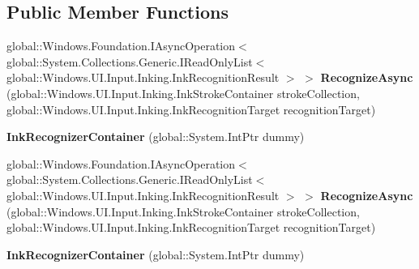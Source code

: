 \subsection*{Public Member Functions}
\begin{DoxyCompactItemize}
\item 
\mbox{\label{class_windows_1_1_u_i_1_1_input_1_1_inking_1_1_ink_recognizer_container_abab854db5f283434d57a1f4170f14769}} 
global\+::\+Windows.\+Foundation.\+I\+Async\+Operation$<$ global\+::\+System.\+Collections.\+Generic.\+I\+Read\+Only\+List$<$ global\+::\+Windows.\+U\+I.\+Input.\+Inking.\+Ink\+Recognition\+Result $>$ $>$ {\bfseries Recognize\+Async} (global\+::\+Windows.\+U\+I.\+Input.\+Inking.\+Ink\+Stroke\+Container stroke\+Collection, global\+::\+Windows.\+U\+I.\+Input.\+Inking.\+Ink\+Recognition\+Target recognition\+Target)
\item 
\mbox{\label{class_windows_1_1_u_i_1_1_input_1_1_inking_1_1_ink_recognizer_container_a9ccc23f7cda60be5d7638b6d3d12400f}} 
{\bfseries Ink\+Recognizer\+Container} (global\+::\+System.\+Int\+Ptr dummy)
\item 
\mbox{\label{class_windows_1_1_u_i_1_1_input_1_1_inking_1_1_ink_recognizer_container_abab854db5f283434d57a1f4170f14769}} 
global\+::\+Windows.\+Foundation.\+I\+Async\+Operation$<$ global\+::\+System.\+Collections.\+Generic.\+I\+Read\+Only\+List$<$ global\+::\+Windows.\+U\+I.\+Input.\+Inking.\+Ink\+Recognition\+Result $>$ $>$ {\bfseries Recognize\+Async} (global\+::\+Windows.\+U\+I.\+Input.\+Inking.\+Ink\+Stroke\+Container stroke\+Collection, global\+::\+Windows.\+U\+I.\+Input.\+Inking.\+Ink\+Recognition\+Target recognition\+Target)
\item 
\mbox{\label{class_windows_1_1_u_i_1_1_input_1_1_inking_1_1_ink_recognizer_container_a9ccc23f7cda60be5d7638b6d3d12400f}} 
{\bfseries Ink\+Recognizer\+Container} (global\+::\+System.\+Int\+Ptr dummy)
\item 
\mbox{\label{class_windows_1_1_u_i_1_1_input_1_1_inking_1_1_ink_recognizer_container_abab854db5f283434d57a1f4170f14769}} 

\end{DoxyCompactItemize}
